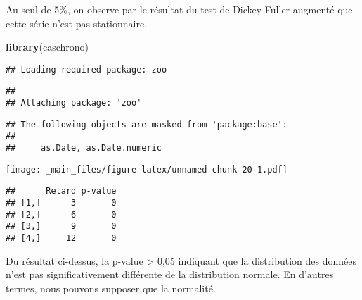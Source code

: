 \documentclass[
]{book}
\newenvironment{Shaded}{\begin{snugshade}}{\end{snugshade}}
\newcommand{\AttributeTok}[1]{\textcolor[rgb]{0.13,0.29,0.53}{#1}}
\newcommand{\DecValTok}[1]{\textcolor[rgb]{0.00,0.00,0.81}{#1}}
\newcommand{\FunctionTok}[1]{\textcolor[rgb]{0.13,0.29,0.53}{\textbf{#1}}}
\newcommand{\NormalTok}[1]{#1}
\newcommand{\SpecialCharTok}[1]{\textcolor[rgb]{0.81,0.36,0.00}{\textbf{#1}}}
\newcommand{\StringTok}[1]{\textcolor[rgb]{0.31,0.60,0.02}{#1}}
\theoremstyle{definition}
\theoremstyle{definition}
\theoremstyle{definition}
\theoremstyle{definition}
\theoremstyle{remark}
\begin{document}
Au seul de 5\%, on observe par le résultat du test de Dickey-Fuller augmenté que cette série n'est pas stationnaire.

\begin{Shaded}
\begin{Highlighting}[]
\FunctionTok{library}\NormalTok{(caschrono)}
\end{Highlighting}
\end{Shaded}

\begin{verbatim}
## Loading required package: zoo
\end{verbatim}

\begin{verbatim}
## 
## Attaching package: 'zoo'
\end{verbatim}

\begin{verbatim}
## The following objects are masked from 'package:base':
## 
##     as.Date, as.Date.numeric
\end{verbatim}

\begin{Shaded}
\end{Shaded}

\texttt{[image: \_main\_files/figure-latex/unnamed-chunk-20-1.pdf]}

\begin{Shaded}
\end{Shaded}

\begin{verbatim}
##      Retard p-value
## [1,]      3       0
## [2,]      6       0
## [3,]      9       0
## [4,]     12       0
\end{verbatim}

Du résultat ci-dessus, la p-value \textgreater{} 0,05 indiquant que la distribution des données n'est pas significativement différente de la distribution normale. En d'autres termes, nous pouvons supposer que la normalité.
\end{document}

